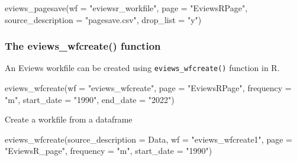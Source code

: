 \documentclass[
  letterpaper,
  DIV=11,
  numbers=noendperiod]{scrartcl}
\newenvironment{Shaded}{\begin{snugshade}}{\end{snugshade}}
\newcommand{\AttributeTok}[1]{\textcolor[rgb]{0.40,0.45,0.13}{#1}}
\newcommand{\FunctionTok}[1]{\textcolor[rgb]{0.28,0.35,0.67}{#1}}
\newcommand{\NormalTok}[1]{\textcolor[rgb]{0.00,0.23,0.31}{#1}}
\newcommand{\StringTok}[1]{\textcolor[rgb]{0.13,0.47,0.30}{#1}}
\begin{document}
\begin{Shaded}
\begin{Highlighting}[]
\FunctionTok{eviews\_pagesave}\NormalTok{(}\AttributeTok{wf =} \StringTok{"eviewsr\_workfile"}\NormalTok{, }\AttributeTok{page =} \StringTok{"EviewsRPage"}\NormalTok{,}
    \AttributeTok{source\_description =} \StringTok{"pagesave.csv"}\NormalTok{, }\AttributeTok{drop\_list =} \StringTok{"y"}\NormalTok{)}
\end{Highlighting}
\end{Shaded}

\begin{figure}

\end{figure}

\hypertarget{the-eviews_wfcreate-function}{%
\subsubsection{The eviews\_wfcreate()
function}\label{the-eviews_wfcreate-function}}

An Eviews workfile can be created using \texttt{eviews\_wfcreate()}
function in R.

\begin{Shaded}
\begin{Highlighting}[]
\FunctionTok{eviews\_wfcreate}\NormalTok{(}\AttributeTok{wf =} \StringTok{"eviews\_wfcreate"}\NormalTok{, }\AttributeTok{page =} \StringTok{"EviewsRPage"}\NormalTok{,}
    \AttributeTok{frequency =} \StringTok{"m"}\NormalTok{, }\AttributeTok{start\_date =} \StringTok{"1990"}\NormalTok{, }\AttributeTok{end\_date =} \StringTok{"2022"}\NormalTok{)}
\end{Highlighting}
\end{Shaded}

\begin{figure}

\end{figure}

Create a workfile from a dataframe

\begin{Shaded}
\begin{Highlighting}[]
\FunctionTok{eviews\_wfcreate}\NormalTok{(}\AttributeTok{source\_description =}\NormalTok{ Data, }\AttributeTok{wf =} \StringTok{"eviews\_wfcreate1"}\NormalTok{,}
    \AttributeTok{page =} \StringTok{"EviewsR\_page"}\NormalTok{, }\AttributeTok{frequency =} \StringTok{"m"}\NormalTok{, }\AttributeTok{start\_date =} \StringTok{"1990"}\NormalTok{)}
\end{Highlighting}
\end{Shaded}
\end{document}
